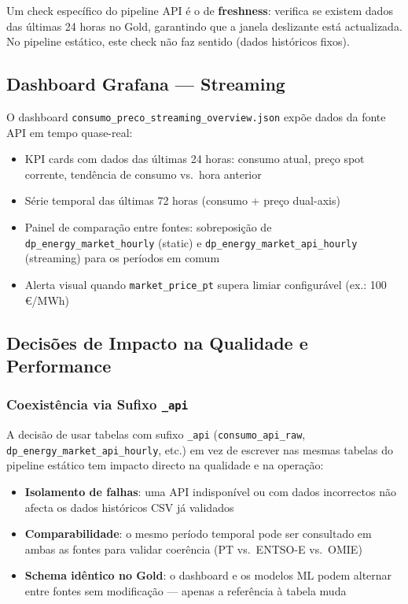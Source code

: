 \documentclass[11pt,a4paper]{article}
\begin{document}
Um check específico do pipeline API é o de \textbf{freshness}: verifica se existem dados das últimas 24 horas no Gold, garantindo que a janela deslizante está actualizada. No pipeline estático, este check não faz sentido (dados históricos fixos).

\subsection{Dashboard Grafana — Streaming}

O dashboard \texttt{consumo\_preco\_streaming\_overview.json} expõe dados da fonte API em tempo quase-real:

\begin{itemize}[leftmargin=*,noitemsep]
  \item KPI cards com dados das últimas 24 horas: consumo atual, preço spot corrente, tendência de consumo vs.\ hora anterior
  \item Série temporal das últimas 72 horas (consumo + preço dual-axis)
  \item Painel de comparação entre fontes: sobreposição de \texttt{dp\_energy\_market\_hourly} (static) e \texttt{dp\_energy\_market\_api\_hourly} (streaming) para os períodos em comum
  \item Alerta visual quando \texttt{market\_price\_pt} supera limiar configurável (ex.: 100 €/MWh)
\end{itemize}

\subsection{Decisões de Impacto na Qualidade e Performance}

\subsubsection{Coexistência via Sufixo \texttt{\_api}}

A decisão de usar tabelas com sufixo \texttt{\_api} (\texttt{consumo\_api\_raw}, \texttt{dp\_energy\_market\_api\_hourly}, etc.) em vez de escrever nas mesmas tabelas do pipeline estático tem impacto directo na qualidade e na operação:

\begin{itemize}[leftmargin=*,noitemsep]
  \item \textbf{Isolamento de falhas}: uma API indisponível ou com dados incorrectos não afecta os dados históricos CSV já validados
  \item \textbf{Comparabilidade}: o mesmo período temporal pode ser consultado em ambas as fontes para validar coerência (PT vs.\ ENTSO-E vs.\ OMIE)
  \item \textbf{Schema idêntico no Gold}: o dashboard e os modelos ML podem alternar entre fontes sem modificação — apenas a referência à tabela muda
\end{itemize}
\end{document}
